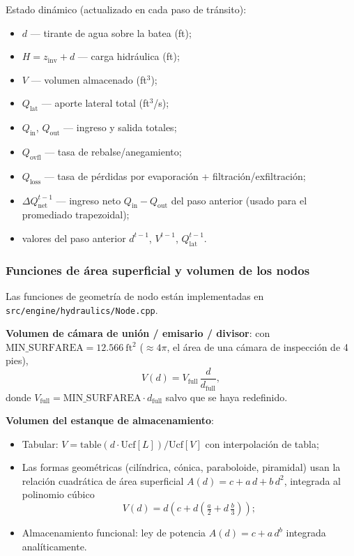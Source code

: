 \documentclass[11pt,a4paper]{article}
\newcommand{\sfft}{\mathrm{ft^2}}
\newcommand{\src}[1]{\texttt{src/engine/#1}}
\begin{document}
Estado dinámico (actualizado en cada paso de tránsito):
\begin{itemize}[nosep]
  \item $d$ --- tirante de agua sobre la batea (ft);
  \item $H = z_{\mathrm{inv}} + d$ --- carga hidráulica (ft);
  \item $V$ --- volumen almacenado (ft$^3$);
  \item $Q_{\mathrm{lat}}$ --- aporte lateral total (ft$^3$/s);
  \item $Q_{\mathrm{in}}$, $Q_{\mathrm{out}}$ --- ingreso y salida totales;
  \item $Q_{\mathrm{ovfl}}$ --- tasa de rebalse/anegamiento;
  \item $Q_{\mathrm{loss}}$ --- tasa de pérdidas por evaporación +
        filtración/exfiltración;
  \item $\Delta Q_{\mathrm{net}}^{t-1}$ --- ingreso neto $Q_{\mathrm{in}} -
        Q_{\mathrm{out}}$ del paso anterior (usado para el promediado
        trapezoidal);
  \item valores del paso anterior $d^{t-1}$, $V^{t-1}$, $Q_{\mathrm{lat}}^{t-1}$.
\end{itemize}

\subsubsection{Funciones de área superficial y volumen de los nodos}

Las funciones de geometría de nodo están implementadas en
\src{hydraulics/Node.cpp}.

\textbf{Volumen de cámara de unión / emisario / divisor}: con
$\mathrm{MIN\_SURFAREA} = 12.566\ \sfft$ ($\approx 4\pi$, el área de una
cámara de inspección de 4 pies),
\begin{equation}
  V(d) = V_{\mathrm{full}}\,\frac{d}{d_{\mathrm{full}}},
\end{equation}
donde $V_{\mathrm{full}} = \mathrm{MIN\_SURFAREA}\cdot d_{\mathrm{full}}$
salvo que se haya redefinido.

\textbf{Volumen del estanque de almacenamiento}:
\begin{itemize}[nosep]
  \item Tabular: $V = \mathrm{table}(d\cdot \mathrm{Ucf}[L])/\mathrm{Ucf}[V]$
        con interpolación de tabla;
  \item Las formas geométricas (cilíndrica, cónica, paraboloide, piramidal)
        usan la relación cuadrática de área superficial
        $A(d) = c + a\,d + b\,d^{2}$, integrada al polinomio cúbico
        \begin{equation}
          V(d) = d\left(c + d\!\left(\tfrac{a}{2} + d\,\tfrac{b}{3}\right)\right);
        \end{equation}
  \item Almacenamiento funcional: ley de potencia $A(d) = c + a\,d^{b}$
        integrada analíticamente.
\end{itemize}
\end{document}

